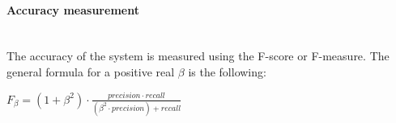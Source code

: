 



		\paragraph{Accuracy measurement}\mbox{}\\


		The accuracy of the system is measured using the F-score or F-measure. 
		The general formula for a positive real $\beta$ is the following: 
		\\
		\begin{center}
		$F_\beta=(1+\beta^2)\cdot\frac{precision \cdot recall}{(\beta^2 \cdot precision )+recall}$
		\end{center}
		\\



		

